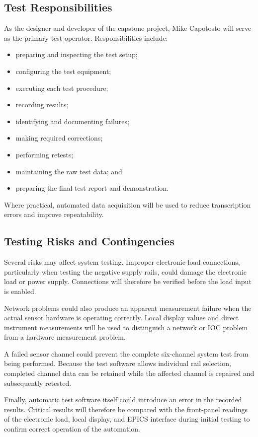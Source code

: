 \subsection{Test Responsibilities}

As the designer and developer of the capstone project, Mike Capotosto will serve as the
primary test operator. Responsibilities include:

\begin{itemize}
	\item preparing and inspecting the test setup;
	\item configuring the test equipment;
	\item executing each test procedure;
	\item recording results;
	\item identifying and documenting failures;
	\item making required corrections;
	\item performing retests;
	\item maintaining the raw test data; and
	\item preparing the final test report and demonstration.
\end{itemize}

Where practical, automated data acquisition will be used to reduce transcription
errors and improve repeatability.

\subsection{Testing Risks and Contingencies}

Several risks may affect system testing. Improper electronic-load connections,
particularly when testing the negative supply rails, could damage the electronic
load or power supply. Connections will therefore be verified before the load input
is enabled.

Network problems could also produce an apparent measurement failure when the actual
sensor hardware is operating correctly. Local display values and direct instrument
measurements will be used to distinguish a network or IOC problem from a hardware
measurement problem.

A failed sensor channel could prevent the complete six-channel system test from
being performed. Because the test software allows individual rail selection, completed
channel data can be retained while the affected channel is repaired and subsequently
retested.

Finally, automatic test software itself could introduce an error in the recorded
results. Critical results will therefore be compared with the front-panel readings
of the electronic load, local display, and EPICS interface during
initial testing to confirm correct operation of the automation.

